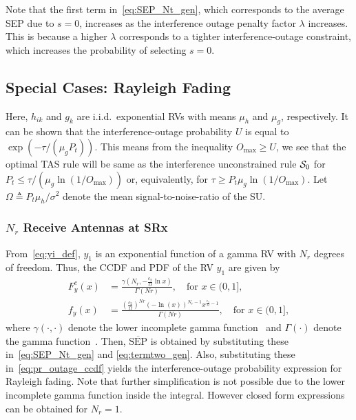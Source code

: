 \documentclass[12pt,draftcls,peerreview,onecolumn]{IEEEtran}
\newcommand{\define}{\triangleq}
\newcommand{\SEP}{\text{SEP}}
\newcommand{\nx}{{0}}
\newcommand{\lam}{\lambda}
\newcommand{\mug}{{\mu_{g}}}
\newcommand{\muh}{{\mu_{h}}}
\newcommand{\Nt}{{N_t}}
\newcommand{\Nr}{{N_r}}
\newcommand{\Pt}{{P_t}}
\newcommand{\such}{h}
\newcommand{\puch}{g}
\newcommand{\hk}[1]{{\such_{#1}}}
\newcommand{\gk}[1]{{\puch_{#1}}}
\newcommand{\noisevar}{\sigma^2}
\newcommand{\outmax}{O_{\text{max}}}
\newcommand{\itau}{\tau}
\newcommand{\cone}{c_{1}}
\newcommand{\ctwo}{c_{2}}
\newcommand{\m}{\cone}
\newcommand{\lambym}{\frac{\lam}{\m}}
\newcommand{\yk}[1]{y_{#1}}
\newcommand{\inlccdfg}[1][]{\exp\left({-{{#1}\itau}/{\left( \mug\Pt\right) }}\right)}
\newcommand{\al}{\ctwo}
\newcommand{\snr}{\Omega}
\newcommand{\albysnr}[1][]{\frac{\al#1}{\snr}}
\newcommand{\un}{U}
\newcommand{\caluncons}{{\cal S_{\text{0}}}}
\newcommand{\avgSEP}{\overline{\SEP}}
\newcommand{\ccdfyNr}[1]{\frac{\gamma\left(\Nr,-\albysnr\ln{#1}\right)}{\Gamma\left(Nr\right)}}
\newcommand{\unccdfy}[2]{\frac{{#1}\,\,\gamma\left(\Nr,-\albysnr\ln{#2}\right)}{\Gamma\left(Nr\right)}}
\newcommand{\pdfyNr}{\frac{\left(\albysnr\right)^{Nr}\left(-\ln\left({x}\right)\right)^{\Nr-1}x^{\albysnr[]-1}}{\Gamma(Nr)}} %
\newcommand{\ytimespdfyNr}{\left(\ln\left(\frac{1}{x}\right)\right)^{\Nr-1}x^{\albysnr[]}} %
\newcommand{\ypluslamtimespdfyNr}{\left(\ln\left(\frac{1}{x+\lambym}\right)\right)^{\Nr-1}\left(x+\lambym\right)^{\albysnr[]}} %
\newcommand{\pdfyNrgen}[1]{f_{y}\left(#1\right)} %
\newcommand{\ccdfyrv}[1]{ F^{c}_{y}\left(#1 \right) }
\begin{document}
Note that the first term in~\eqref{eq:SEP_Nt_gen}, which corresponds to the average SEP due to $s=\nx$, increases as the interference outage penalty factor $\lam$ increases. This is because a higher $\lam$ corresponds to a tighter interference-outage constraint, which increases the probability of selecting $s=\nx$. 
%


\subsection{Special Cases: Rayleigh Fading}
Here, $\hk{ik}$ and $\gk{k}$ are i.i.d.\ exponential RVs with means $\muh$ and $\mug$, respectively. It can be shown that the interference-outage probability $\un$ is equal to $\inlccdfg[]$. This means from the inequality $\outmax\geq\un$, we see that the optimal TAS rule will be same as the interference unconstrained rule $\caluncons$ for $\Pt\leq {\tau}/{\left(\mug\ln\left(1/\outmax\right)\right)}$ or, equivalently, for $\itau\geq\Pt\mug\ln\left(1/\outmax\right)$.  Let $\snr\define\Pt\muh/\noisevar$ denote the mean signal-to-noise-ratio of the SU.
\subsubsection{$\Nr$ Receive Antennas at SRx} From~\eqref{eq:yi_def}, $\yk{1}$ is an exponential function of a gamma RV with $\Nr$ degrees of freedom. Thus, the CCDF and PDF of the RV $\yk{1}$ are given by 
\begin{align}
\label{eq:ccdfyNr}
\ccdfyrv{x} &= \ccdfyNr{x}, \quad \text{for}\,\, x \in (0,1],\\
\label{eq:pdfyNr}
\pdfyNrgen{x} &= \pdfyNr, \quad \text{for}\,\,  x \in (0,1],
\end{align}
where $\gamma(\cdot,\cdot)$ denote the lower incomplete gamma function~\cite[(8.350.1)]{gradshteyn00_book} and $\Gamma(\cdot)$ denote the gamma function~\cite[(8.339.1)]{gradshteyn00_book}. Then, $\avgSEP$ is obtained by substituting these in~\eqref{eq:SEP_Nt_gen} and \eqref{eq:termtwo_gen}. Also, substituting these in~\eqref{eq:pr_outage_ccdf} yields the interference-outage probability expression for Rayleigh fading. Note that further simplification is not possible due to the lower incomplete gamma function inside the integral.  However closed form expressions can be obtained for $\Nr=1$.
%
\end{document}
